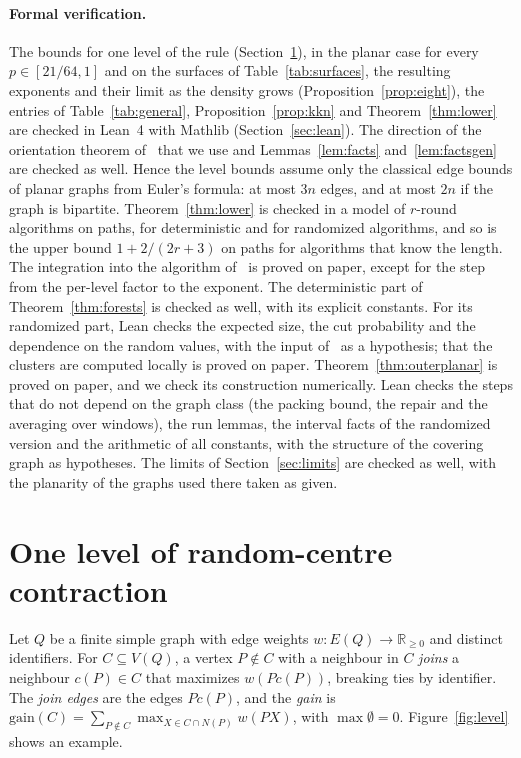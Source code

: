 \documentclass[11pt]{article}
\theoremstyle{remark}
\begin{document}
\paragraph{Formal verification.} The bounds for one level of the rule (Section~\ref{sec:rule}), in the
planar case for every $p\in[21/64,1]$ and on the surfaces of Table~\ref{tab:surfaces}, the resulting
exponents and their limit as the density grows (Proposition~\ref{prop:eight}), the entries of
Table~\ref{tab:general}, Proposition~\ref{prop:kkn} and Theorem~\ref{thm:lower} are checked in Lean~4
with Mathlib (Section~\ref{sec:lean}). The direction
of the orientation theorem of~\cite{H65} that we use and Lemmas~\ref{lem:facts}
and~\ref{lem:factsgen} are checked as well. Hence the level bounds assume only the classical edge
bounds of planar graphs from Euler's formula: at most $3n$ edges, and at most $2n$ if the graph is
bipartite. Theorem~\ref{thm:lower} is checked in a model of
$r$-round algorithms on paths, for deterministic and for randomized algorithms, and so is the
upper bound $1+2/(2r+3)$ on paths for algorithms that know the length. The integration into the algorithm of~\cite{AS26} is proved on paper, except
for the step from the per-level factor to the exponent. The deterministic part of
Theorem~\ref{thm:forests} is checked as well, with its explicit constants. For its randomized part,
Lean checks the expected size, the cut probability and the dependence on the random values, with the
input of~\cite{LOW08} as a hypothesis; that the clusters are computed locally is proved on paper.
Theorem~\ref{thm:outerplanar} is proved on paper, and we check its construction numerically. Lean
checks the steps that do not depend on the graph class (the packing bound, the repair and the
averaging over windows), the run lemmas, the interval facts of the randomized version and the
arithmetic of all constants, with the structure of the covering graph as hypotheses. The limits of
Section~\ref{sec:limits} are checked as well, with the planarity of the graphs used there taken as
given.

\section{One level of random-centre contraction}\label{sec:rule}

Let $Q$ be a finite simple graph with edge weights $w\colon E(Q)\to\mathbb{R}_{\ge0}$ and distinct
identifiers. For $C\subseteq V(Q)$, a vertex $P\notin C$ with a neighbour in $C$ \emph{joins} a
neighbour $c(P)\in C$ that maximizes $w(Pc(P))$, breaking ties by identifier. The \emph{join edges}
are the edges $Pc(P)$, and the \emph{gain} is $\mathrm{gain}(C)=\sum_{P\notin C}\max_{X\in C\cap
N(P)}w(PX)$, with $\max\emptyset=0$. Figure~\ref{fig:level} shows an example.
\end{document}
